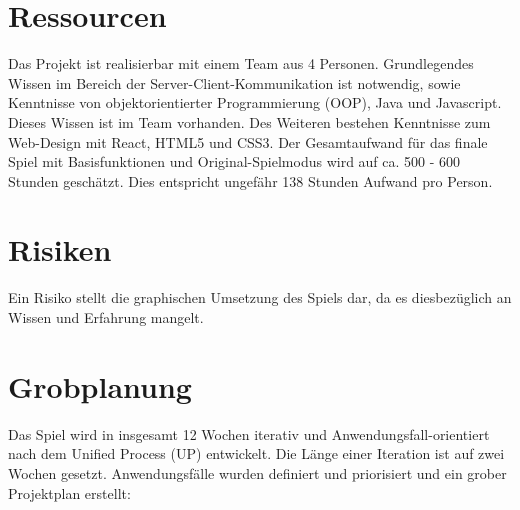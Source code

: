 \documentclass[11pt,ngerman]{article}
\begin{document}
    \section{Ressourcen}
    Das Projekt ist realisierbar mit einem Team aus 4 Personen. Grundlegendes Wissen im Bereich der Server-Client-Kommunikation ist notwendig, sowie Kenntnisse von objektorientierter Programmierung (\Gls{OOP}), Java und Javascript. Dieses Wissen ist im Team vorhanden. Des Weiteren bestehen Kenntnisse zum Web-Design mit React, HTML5 und CSS3.
    Der Gesamtaufwand für das finale Spiel mit Basisfunktionen und Original-Spielmodus wird auf ca. 500 - 600 Stunden geschätzt. Dies entspricht ungefähr 138 Stunden Aufwand pro Person.

    \section{Risiken}
    Ein Risiko stellt die graphischen Umsetzung des Spiels dar, da es diesbezüglich an Wissen und Erfahrung mangelt.

    \section{Grobplanung}
    Das Spiel wird in insgesamt 12 Wochen iterativ und Anwendungsfall-orientiert nach dem \Gls{Unified Process (UP)} entwickelt. Die Länge einer Iteration ist auf zwei Wochen gesetzt. Anwendungsfälle wurden definiert und priorisiert und ein grober Projektplan erstellt:
\end{document}
